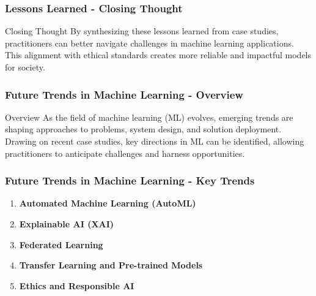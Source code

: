 \documentclass{beamer}
\begin{document}
\begin{frame}[fragile]
    \frametitle{Lessons Learned - Closing Thought}
    \begin{block}{Closing Thought}
        By synthesizing these lessons learned from case studies, practitioners can better navigate challenges in machine learning applications. This alignment with ethical standards creates more reliable and impactful models for society.
    \end{block}
\end{frame}

\begin{frame}[fragile]
    \frametitle{Future Trends in Machine Learning - Overview}
    \begin{block}{Overview}
        As the field of machine learning (ML) evolves, emerging trends are shaping approaches to problems, system design, and solution deployment. 
        Drawing on recent case studies, key directions in ML can be identified, allowing practitioners to anticipate challenges and harness opportunities.
    \end{block}
\end{frame}

\begin{frame}[fragile]
    \frametitle{Future Trends in Machine Learning - Key Trends}
    \begin{enumerate}
        \item \textbf{Automated Machine Learning (AutoML)}
        \item \textbf{Explainable AI (XAI)}
        \item \textbf{Federated Learning}
        \item \textbf{Transfer Learning and Pre-trained Models}
        \item \textbf{Ethics and Responsible AI}
    \end{enumerate}
\end{frame}
\end{document}
